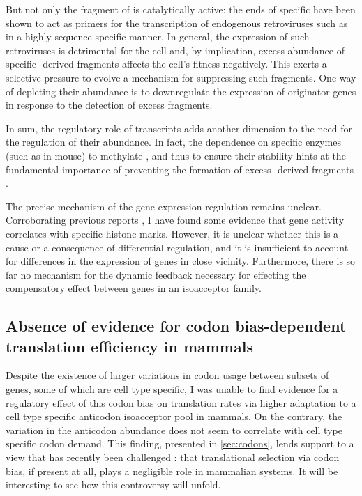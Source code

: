 But not only the \fivep fragment of \trna[s] is catalytically active: the
\threep ends of specific \trna[s] have been shown to act as primers for the
transcription of endogenous retroviruses such as \hivi \citep{Litvak:1994} in a
highly sequence-specific manner. In general, the expression of such retroviruses
is detrimental for the cell and, by implication, excess abundance of specific
\trna-derived fragments affects the cell’s fitness negatively. This exerts a
selective pressure to evolve a mechanism for suppressing such fragments. One way
of depleting their abundance is to downregulate the expression of originator
\trna genes in response to the detection of excess \trna fragments.

In sum, the regulatory role of \trna transcripts adds another dimension to the
need for the regulation of their abundance. In fact, the dependence on specific
enzymes (such as  in mouse) to methylate \trna[s], and thus
to ensure their stability hints at the fundamental importance of preventing the
formation of excess \trna-derived fragments \citep{Blanco:2014}.

The precise mechanism of the \trna gene expression regulation remains unclear.
Corroborating previous reports \citep{Oler:2010}, I have found some evidence
that \trna gene activity correlates with specific histone marks. However, it is
unclear whether this is a cause or a consequence of differential regulation, and
it is insufficient to account for differences in the expression of \trna genes
in close vicinity. Furthermore, there is so far no mechanism for the dynamic
feedback necessary for effecting the compensatory effect between genes in an
isoacceptor family.

\subsection{Absence of evidence for codon bias-dependent translation efficiency in mammals}

Despite the existence of larger variations in codon usage between subsets of
genes, some of which are cell type specific, I was unable to find evidence for a
regulatory effect of this codon bias on translation rates via higher adaptation
to a cell type specific \trna anticodon isoacceptor pool in mammals. On the
contrary, the variation in the \trna anticodon abundance does not seem to
correlate with cell type specific codon demand. This finding, presented in
\cref{sec:codons}, lends support to a view that has recently been challenged
\citep{Gingold:2014,Wilusz:2015}: that translational selection via codon bias,
if present at all, plays a negligible role in mammalian systems. It will be
interesting to see how this controversy will unfold.

